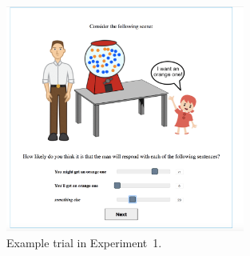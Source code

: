 \documentclass[man, floatsintext]{apa6}
\begin{document}
\begin{figure}[th!]
\center
\includegraphics[width=0.7\textwidth, trim={0 0 1.1cm 0},clip]{plots/pre-test-example-trial.png} 
\caption{Example trial in Experiment~1. \label{fig:norming-trial} }
\end{figure}
\end{document}
